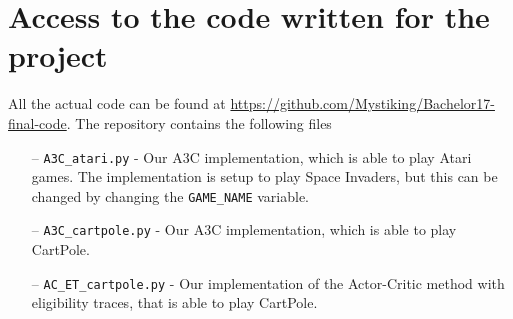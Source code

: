 \documentclass[11pt]{article}
\begin{document}
\section{Access to the code written for the project}\label{a:code}

All the actual code can be found at
\url{https://github.com/Mystiking/Bachelor17-final-code}.
The repository contains the following files
\begin{itemize}
    \item[--] \texttt{A3C\_atari.py} - Our A3C implementation, which is able to play Atari games.
        The implementation is setup to play Space Invaders, but this can be changed by changing the
        \texttt{GAME\_NAME} variable.
    \item[--] \texttt{A3C\_cartpole.py} - Our A3C implementation, which is able to play CartPole. 
    \item[--] \texttt{AC\_ET\_cartpole.py} - Our implementation of the Actor-Critic method with eligibility traces, that is able to play CartPole.
\end{itemize}
\end{document}
